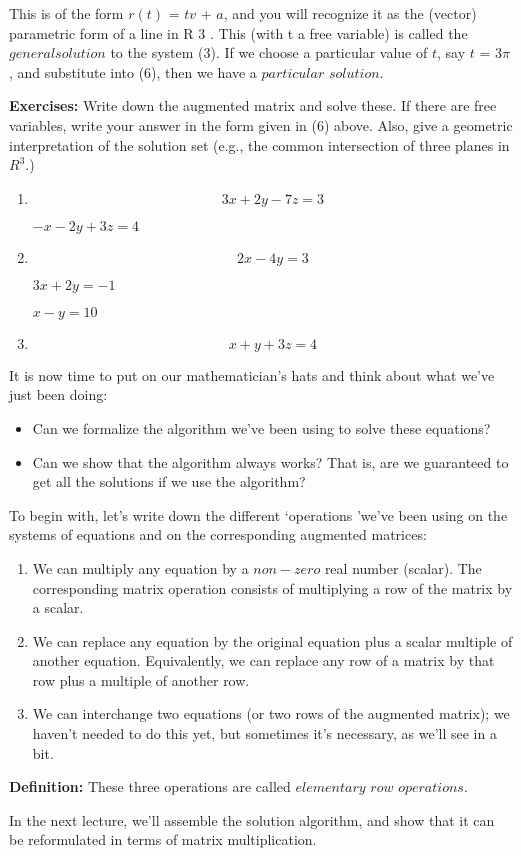 \documentclass{book}
\begin{document}
This is of the form $r(t)$ = $tv$ + $a$, and you will recognize it as the (vector) parametric form of a line in R 3 . This (with t a free variable) is called the $general solution$ to the system (3). If we choose a particular value of $t$, say $t$ = 3$π$, and substitute into (6), then we have a $particular$ $solution$.

\textbf{Exercises:} Write down the augmented matrix and solve these. If there are free variables, write your answer in the form given in (6) above. Also, give a geometric interpretation of the solution set (e.g., the common intersection of three planes in $R^3$.)

\begin{enumerate} 
	\item $$ 3x + 2y - 7z = 3 $$  
		\begin{center} $-x - 2y + 3z = 4$ \end{center}
	\item $$ 2x − 4y = 3 $$ 
		\begin{center} $ 3x + 2y = −1 $ \end{center} 
			\begin{center}$ x − y = 10$ \end{center}

			\item $$ x + y + 3z = 4 $$
\end{enumerate}

It is now time to put on our mathematician\rq s hats and think about what we\rq ve just been doing:

\begin{itemize}
	\item Can we formalize the algorithm we\rq ve been using to solve these equations?
	\item Can we show that the algorithm always works? That is, are we guaranteed to get all the solutions if we use the algorithm?
\end{itemize}

To begin with, let\rq s write down the different \lq operations \rq we\rq ve been using on the systems of equations and on the corresponding augmented matrices:

\begin{enumerate}
	\item We can multiply any equation by a $non-zero$ real number (scalar). The corresponding matrix operation consists of multiplying a row of the matrix by a scalar. 
	\item We can replace any equation by the original equation plus a scalar multiple of another equation. Equivalently, we can replace any row of a matrix by that row plus a multiple of another row.
	\item We can interchange two equations (or two rows of the augmented matrix); we haven\rq t needed to do this yet, but sometimes it\rq s necessary, as we\rq ll see in a bit.
\end{enumerate}

\textbf{Definition:} These three operations are called $elementary$ $row$ $operations$.

In the next lecture, we\rq ll assemble the solution algorithm, and show that it can be reformulated in terms of matrix multiplication.
		
\end{document}
